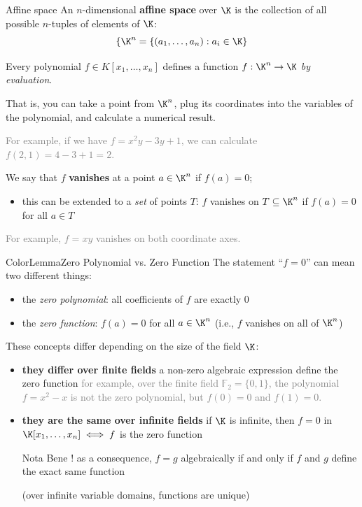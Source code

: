 \documentclass[a4paper, 11pt]{report}
\begin{document}
\begin{defframe}{Affine space}{}
    An $n$-dimensional \textbf{affine space} over $\K$ is the collection of all possible $n$-tuples of elements of $\K$:
    $$\{\K^{n} = \{(a_1, \dots, a_n) : a_i \in \K\}$$
\end{defframe}

Every polynomial $f \in K[x_{1}, \dots, x_{n}]$ defines a function $f: \K^{n} \to \K$ \textit{by evaluation}. 

That is, you can take a point from $\K^{n}$, plug its coordinates into the variables of the polynomial, and calculate a numerical result.

\textcolor{gray}{For example, if we have $f = x^{2}y - 3y + 1$, we can calculate $f(2, 1) = 4-3+1 = 2$.}

We say that $f$ \textbf{vanishes} at a point $a \in \K^{n}$ if $f(a) = 0$;
\begin{itemize}
    \item this can be extended to a \textit{set} of points $T$: $f$ vanishes on $T \subseteq \K^{n}$ if $f(a) = 0$ for all $a \in T$
\end{itemize}

\textcolor{gray}{For example, $f = xy$ vanishes on both coordinate axes.} 

\begin{cframe}{ColorLemma}{Zero Polynomial vs. Zero Function}{}
    The statement ``$f = 0$'' can mean two different things:
    \begin{itemize}
        \item the \textit{zero polynomial}: all coefficients of $f$ are exactly $0$
        \item the \textit{zero function}: $f(a) = 0$ for all $a \in \K^{n}$ (i.e., $f$ vanishes on all of $\K^n$)
    \end{itemize}

These concepts differ depending on the size of the field $\K$:

\begin{itemize}
    \item \textbf{they differ over finite fields}
        \subitem a non-zero algebraic expression define the zero function
    \subitem \textcolor{gray}{for example, over the finite field $\mathbb{F}_2 = \{0, 1\}$, the polynomial $f = x^2 - x$ is not the zero polynomial, but $f(0) = 0$ and $f(1) = 0$.}

    \item \textbf{they are the same over infinite fields} 
   \subitem if $\K$ is infinite, then $f = 0$ in $\K[x_1, \dots, x_n] \iff f$ is the zero function

   \begin{gframe}{Nota Bene !}
       as a consequence, $f = g$ algebraically if and only if $f$ and $g$ define the exact same function

       (over infinite variable domains, functions are unique)
   \end{gframe}
\end{itemize}

\end{cframe}
\end{document}
